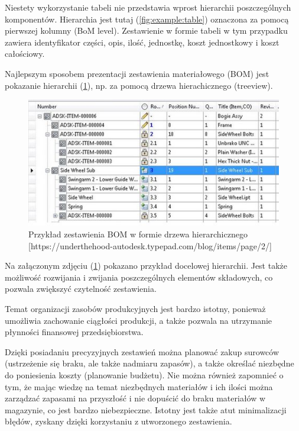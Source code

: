 \documentclass[12pt,twoside]{article}
\begin{document}
Niestety wykorzystanie tabeli nie przedstawia wprost hierarchii poszczególnych komponentów. Hierarchia jest tutaj (\ref{fig:example:table}) oznaczona za pomocą pierwszej kolumny (BoM level). Zestawienie w formie tabeli w tym przypadku zawiera identyfikator części, opis, ilość, jednostkę, koszt jednostkowy i koszt całościowy.

Najlepszym sposobem prezentacji zestawienia materiałowego (BOM) jest pokazanie hierarchii (\ref{fig:example:hierarchy}), np. za pomocą drzewa hierachicznego (treeview).

\begin{figure}[ht]
	\centering
	\includegraphics[width=\textwidth]{figures/examples/hierarchy.jpg}
	\caption{Przykład zestawienia BOM w formie drzewa hierarchicznego [https://underthehood-autodesk.typepad.com/blog/items/page/2/]}
\label{fig:example:hierarchy}
\end{figure}

Na załączonym zdjęciu (\ref{fig:example:hierarchy}) pokazano przykład docelowej hierarchii. Jest także możliwość rozwijania i zwijania poszczególnych elementów składowych, co pozwala zwiększyć czytelność zestawienia.

Temat organizacji zasobów produkcyjnych jest bardzo istotny, ponieważ umożliwia zachowanie ciągłości produkcji, a także pozwala na utrzymanie płynności finansowej przedsiębiorstwa.

Dzięki posiadaniu precyzyjnych zestawień można planować zakup surowców (ustrzeżenie się braku, ale także nadmiaru zapasów), a także określać niezbędne do poniesienia koszty (planowanie budżetu). Nie można również zapomnieć o tym, że mając wiedzę na temat niezbędnych materiałów i ich ilości można zarządzać zapasami na przyszłość i nie dopuścić do braku materiałów w magazynie, co jest bardzo niebezpieczne. Istotny jest także atut minimalizacji błędów, zyskany dzięki korzystaniu z utworzonego zestawienia.
\end{document}

